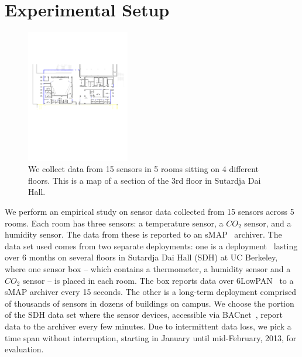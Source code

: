 \section{Experimental Setup}
\begin{figure}[h!]
\centering
	\includegraphics[width=0.4\textwidth]{./fig/SDH3_crop}
\caption{We collect data from 15 sensors in 5 rooms sitting on 4 different floors. This is a map of a section of the 3rd floor
in Sutardja Dai Hall.}
\label{fig:sdh}
\end{figure}

We perform an empirical study on sensor data collected from 15 sensors across 5 rooms. 
Each room has three sensors: a temperature sensor, a $CO_{2}$ sensor,  and a humidity sensor. 
The data from these is reported to an  
sMAP~\cite{smap} archiver. The data set used comes from two separate deployments: one is a deployment~\cite{Jay} lasting 
over 6 months on several floors in Sutardja Dai Hall (SDH) at UC Berkeley, where one sensor box -- which contains a thermometer, a humidity sensor
 and a $CO_{2}$ sensor -- is placed in each room. The box reports data over 6LowPAN~\cite{6lowpan} to a sMAP archiver every 
 15 seconds. The other is a long-term deployment comprised of thousands of sensors in dozens of buildings on campus. 
 We choose the portion of the SDH data set where the sensor devices, accessible via BACnet~\cite{BACnet}, report data to the archiver every few minutes. 
 Due to intermittent data loss, we pick a time span without interruption, starting in January until mid-February, 2013, for evaluation.

